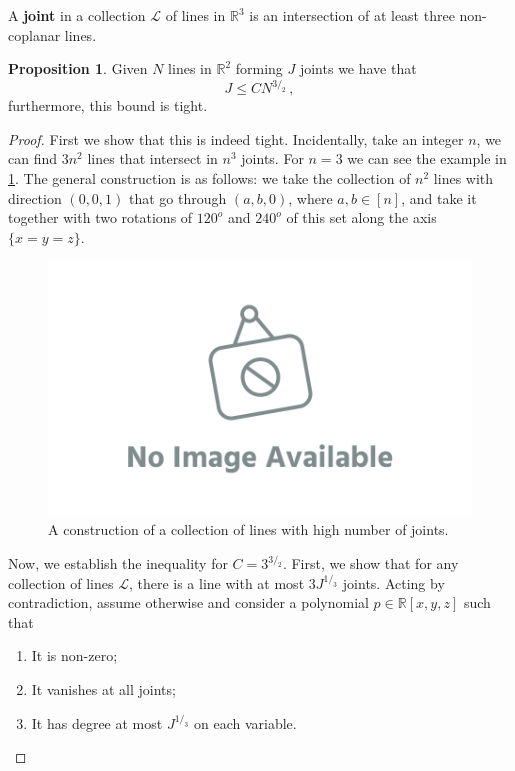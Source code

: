 \documentclass[12pt]{amsart}
\theoremstyle{definition}
\newtheorem{prop}[thm]{Proposition}
\newcommand{\R}{\mathbb{R}}
\begin{document}
A \textbf{joint} in a collection $\mathcal L$ of lines in $\R^3$ is an intersection of at least three non-coplanar lines.


\begin{prop}
Given $N$ lines in $\R^2$ forming $J$ joints we have that
$$ J \leq C N^{3/_2}\, ,$$
furthermore, this bound is tight.
\end{prop}


\begin{proof}
First we show that this is indeed tight.
Incidentally, take an integer $n$, we can find $3n^2$ lines that intersect in $n^3$ joints. For $n=3$ we can see the example in \cref{fig:joints}.
The general construction is as follows: we take the collection of $n^2$ lines with direction $(0, 0, 1)$ that go through $(a, b, 0)$, where $a, b\in [n]$, and take it together with two rotations of $120^o$ and $240^o$ of this set along the axis $\{x = y = z\}$.

\begin{figure}[h]
\includegraphics[scale=.1]{../imgs/ina.png}%
\caption{A construction of a collection of lines with high number of joints.\label{fig:joints}}
\end{figure}

Now, we establish the inequality for $C = 3^{3/_2}$.
First, we show that for any collection of lines $\mathcal L$, there is a line with at most $3 J^{1/_3}$ joints.
Acting by contradiction, assume otherwise and consider a polynomial $p \in \R[x, y, z]$ such that 
\begin{enumerate}
\item It is non-zero;

\item It vanishes at all joints;

\item It has degree at most $J^{1/_3}$ on each variable.
\end{enumerate}


\end{proof}
\end{document}

